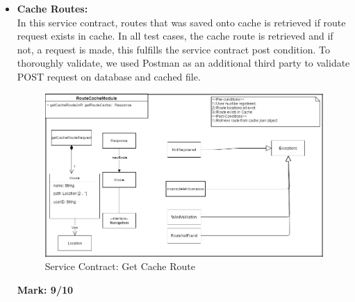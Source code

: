 \begin{itemize}
\newpage	
\item \textbf{Cache Routes:}\\In this service contract, routes that was saved onto cache is retrieved if route request exists in cache. In all test cases, the cache route is retrieved and if not, a request is made, this fulfills the service contract post condition. To thoroughly validate, we used Postman as an additional third party to validate POST request on database and cached file.\\
\begin{figure}[H]
\includegraphics[scale=0.5]{service_contracts/CacheRoute.png}
\caption{Service Contract: Get Cache Route}
\end{figure}
	\textbf{Mark: 9/10}
	
\end{itemize}